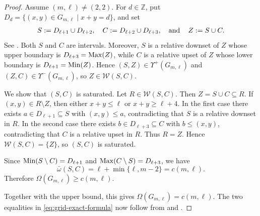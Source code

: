 \begin{proof}
Assume $(m,\ell)\neq(2,2)$.  For $d\in\mathbb Z$, put
$D_d=\{(x,y)\in G_{m,\ell}\mid x+y=d\}$, and set
\begin{equation}
\label{eq:grid-sharp-saturated-pair}
S:=D_{\ell+1}\cup D_{\ell+2},
\quad
C:=D_{\ell+2}\cup D_{\ell+3}, 
\operatorname{\quad \text{and} \quad}\nolimits 
Z:=S\cup C.
\end{equation}
See . 
Both $S$ and $C$ are intervals.  
Moreover, $S$ is a relative downset of $Z$ whose upper boundary is
$D_{\ell+3}=\operatorname{Max}(Z)$, while $C$ is a relative upset of $Z$ whose
lower boundary is $D_{\ell+1}=\operatorname{Min}(Z)$.  Hence
$(S,Z)\in\Upsilon^+(G_{m,\ell})$ and
$(Z,C)\in\Upsilon^-(G_{m,\ell})$, so
$Z\in\mathcal W(S,C)$.

We show that $(S,C)$ is saturated.  Let
$R\in\mathcal W(S,C)$.  Then $Z=S\cup C\subseteq R$.
If $(x,y)\in R\setminus Z$, then either $x+y\leq\ell$ or
$x+y\geq\ell+4$.  In the first case there exists
$a\in D_{\ell+1}\subseteq S$ with $(x,y)\leq a$, contradicting
that $S$ is a relative downset in $R$.  In the second case there
exists $b\in D_{\ell+3}\subseteq C$ with $b\leq(x,y)$,
contradicting that $C$ is a relative upset in $R$.  Thus $R=Z$.
Hence $\mathcal W(S,C)=\{Z\}$, so $(S,C)$ is saturated.

Since
$\operatorname{Min}(S\setminus C)=D_{\ell+1}$ and
$\operatorname{Max}(C\setminus S)=D_{\ell+3}$, we have
\begin{equation}
\label{eq:grid-Z-extremal-count}
\bar\omega(S,C)
=
\ell+\min\{\ell,m-2\}
=
c(m,\ell).
\end{equation}
Therefore $\Omega(G_{m,\ell})\geq c(m,\ell)$.

Together with the upper bound, this gives
$\Omega(G_{m,\ell})=c(m,\ell)$.  The two equalities in
\eqref{eq:grid-exact-formula} now follow from
 and
.
\end{proof}


